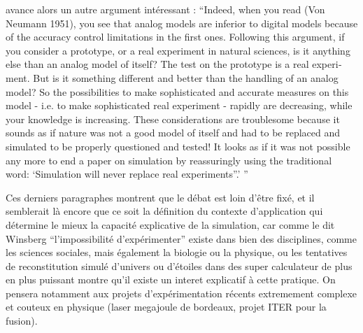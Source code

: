 \textcite{Varenne2001} avance alors un autre argument intéressant : \foreignquote{english}{Indeed, when you read (Von Neumann 1951), you see that analog models are inferior to digital models because of the accuracy control limitations in the first ones. Following this argument, if you consider a prototype, or a real experiment in natural sciences, is it anything else than an analog model of itself? The test on the prototype is a real experiment. But is it something different and better than the handling of an analog model? So the possibilities to make sophisticated and accurate measures on this model - i.e. to make sophisticated real experiment - rapidly are decreasing, while your knowledge is increasing. These considerations are troublesome because it sounds as if nature was not a good model of itself and had to be replaced and simulated to be properly questioned and tested! It looks as if it was not possible any more to end a paper on simulation by reassuringly using the traditional word: \enquote{Simulation will never replace real experiments”.} }

Ces derniers paragraphes montrent que le débat est loin d'être fixé, et il semblerait là encore que ce soit la définition du contexte d'application qui détermine le mieux la capacité explicative de la simulation, car comme le dit Winsberg \enquote{l'impossibilité d'expérimenter} existe dans bien des disciplines, comme les sciences sociales, mais également la biologie ou la physique, ou les tentatives de reconstitution simulé d'univers ou d'étoiles dans des super calculateur de plus en plus puissant montre qu'il existe un interet explicatif à cette pratique. On pensera notamment aux projets d'expérimentation récents extremement complexe et couteux en physique (laser megajoule de bordeaux, projet ITER pour la fusion).


